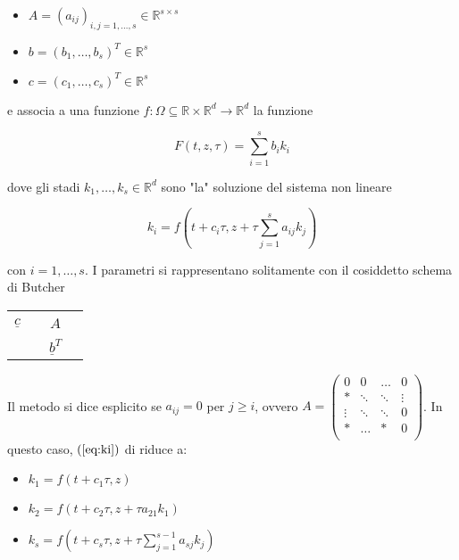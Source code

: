 \documentclass[hidelinks, 10pt]{report}
\begin{document}
\begin{itemize}
\item $ A = (a_{ij})_{i, j = 1, \dotsc, s} \in \mathbb{R}^{s \times s} $
\item $ b = (b_{1}, \dotsc, b_{s})^{T} \in \mathbb{R}^{s} $
\item $ c = (c_{1}, \dotsc, c_{s})^{T} \in \mathbb{R}^{s} $ 
\end{itemize}

e associa a una funzione $ f: \Omega \subseteq \mathbb{R} \times \mathbb{R}^{d} \to \mathbb{R}^{d} $ la funzione

\[ F(t, z, \tau) = \sum\limits_{i = 1}^{s} b_{i} k_{i} \]

dove gli stadi $ k_{1}, \dotsc, k_{s} \in \mathbb{R}^{d} $ sono "la" soluzione del sistema non lineare

\begin{equation}	\label{eq:ki}
k_{i} = f \left( t + c_{i} \tau, z + \tau \sum\limits_{j = 1}^{s} a_{ij} k_{j} \right)
\end{equation}

con $ i = 1, \dotsc, s $. I parametri si rappresentano solitamente con il cosiddetto schema di Butcher

\begin{center}
\begin{tabular}{c|ccc}
                  &   &       & \\
$ \underline{c} $ &   & $ A $ & \\
				  &   &       & \\
\hline
				  &   & $ \underline{b}^{T} $ & \\
\end{tabular}
\end{center}

Il metodo si dice esplicito se $ a_{ij} = 0 $ per $ j \ge i $, ovvero $ A = \begin{pmatrix}
	     0 &      0 & \ldots &      0 \\
	  \ast & \ddots & \ddots & \vdots \\
	\vdots & \ddots & \ddots &      0 \\
	  \ast & \ldots &   \ast &      0 \\
\end{pmatrix} $. In questo caso, $ (\ref{eq:ki}) $ di riduce a:
\begin{itemize}
\item $ k_{1} = f(t + c_{1} \tau, z) $
\item $ k_{2} = f(t + c_{2} \tau, z + \tau a_{21} k_{1}) $
\item $ k_{s} = f \left( t + c_{s} \tau, z + \tau \sum\limits_{j = 1}^{s-1} a_{sj} k_{j} \right) $
\end{itemize}
\end{document}
